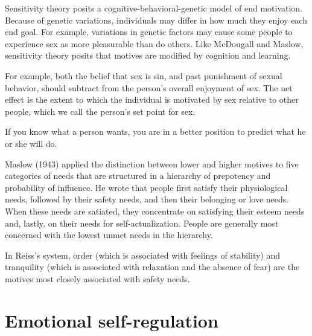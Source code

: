 \documentclass[11pt]{article}
\theoremstyle{remark}
\theoremstyle{definition}
\begin{document}
Sensitivity theory posits a cognitive-behavioral-genetic model of end motivation. Because of genetic variations, individuals may differ in how much they enjoy each end goal. For example, variations in genetic factors may cause some people to experience sex as more pleasurable than do others. Like McDougall and Maslow, sensitivity theory posits that motives are modified by cognition and learning.

For example, both the belief that sex is sin, and past punishment of sexual behavior, should subtract from the person’s overall enjoyment of sex. The net effect is the extent to which the individual is motivated by sex relative to other people, which we call the person’s set point for sex. 

If you know what a person wants, you are in a better position to predict what he or she will do.



Maslow (1943) applied the distinction between lower and higher motives to five categories of needs that are structured in a hierarchy of prepotency and probability of influence. He wrote that people first satisfy their physiological needs, followed by their safety needs, and then their belonging or love needs. When these needs are satiated, they concentrate on satisfying their esteem needs and, lastly, on their needs for self-actualization. People are generally most concerned with the lowest unmet needs in the hierarchy.



In Reiss’s system, order (which is associated with feelings of stability) and tranquility (which is associated with relaxation and the absence of fear) are the motives most closely associated with safety needs.


\section{Emotional self-regulation}










\end{document}
